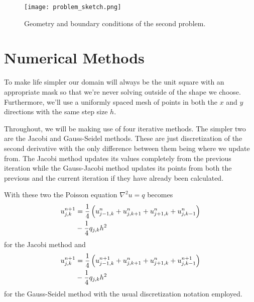 \documentclass[10pt,a4paper,twocolumn]{article}
\begin{document}
\begin{figure}[!h]
    \centering
    \texttt{[image: problem\_sketch.png]}
    \caption{Geometry and boundary conditions of the second problem.}
    \label{fig:problem_sketch}
\end{figure}

\section{Numerical Methods}

To make life simpler our domain will always be the unit square with an appropriate mask so that we're never solving outside of the shape we choose. Furthermore, we'll use a uniformly spaced mesh of points in both the $x$ and $y$ directions with the same step size $h$.

Throughout, we will be making use of four iterative methods. The simpler two are the Jacobi and Gauss-Seidel methods. These are just discretization of the second derivative with the only difference between them being where we update from. The Jacobi method updates its values completely from the previous iteration while the Gauss-Jacobi method updates its points from both the previous and the current iteration if they have already been calculated.

With these two the Poisson equation $\nabla^2 u = q$ becomes
%
\begin{align}
    u_{j,k}^{n+1} &= \frac{1}{4} \left( u_{j-1,k}^n + u_{j,k+1}^n + u_{j+1,k}^n + u_{j,k-1}^n \right)\notag\\ &- \frac{1}{4} q_{j,k}h^2 
\end{align}
%
for the Jacobi method and 
\begin{align}
    u_{j,k}^{n+1} &= \frac{1}{4} \left( u_{j-1,k}^{n+1} + u_{j,k+1}^n + u_{j+1,k}^n + u_{j,k-1}^{n+1} \right)\notag\\ &- \frac{1}{4} q_{j,k}h^2 
\end{align}
%
for the Gauss-Seidel method with the usual discretization notation employed.
\end{document}
